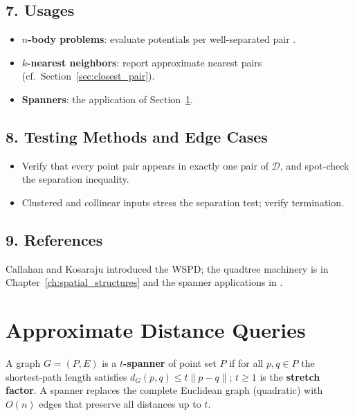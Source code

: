 \subsection{7. Usages}

\begin{itemize}
\item \textbf{$n$-body problems}: evaluate potentials per well-separated
  pair \cite{callahan1995}.
\item \textbf{$k$-nearest neighbors}: report approximate nearest pairs
  (cf.\ Section~\ref{sec:closest_pair}).
\item \textbf{Spanners}: the application of
  Section~\ref{sec:approx_distance_queries}.
\end{itemize}

\subsection{8. Testing Methods and Edge Cases}

\begin{itemize}
\item Verify that every point pair appears in exactly one pair of
  $\mathcal{D}$, and spot-check the separation inequality.
\item Clustered and collinear inputs stress the separation test; verify
  termination.
\end{itemize}

\subsection{9. References}

Callahan and Kosaraju \cite{callahan1995} introduced the WSPD; the quadtree
machinery is in Chapter~\ref{ch:spatial_structures} and the spanner
applications in \cite{harpeled2011}.


\section{Approximate Distance Queries}
\label{sec:approx_distance_queries}

\begin{definition}\label{def:approx_spanner}
  A graph $G = (P, E)$ is a \textbf{$t$-spanner} of point set $P$ if for all
  $p, q \in P$ the shortest-path length satisfies $d_G(p, q) \leq t \|p - q\|$;
  $t \geq 1$ is the \textbf{stretch factor}. A spanner
  replaces the complete Euclidean graph (quadratic) with $O(n)$ edges that
  preserve all distances up to $t$.
\end{definition}

